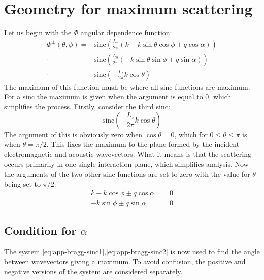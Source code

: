 \documentclass[11pt,twoside]{eitExjobb}
\begin{document}
	\section{Geometry for maximum scattering \label{sec:app-derivations-bragg}}
	Let us begin with the $\Phi$ angular dependence function:
	\begin{equation*}
	\begin{split}
		\Phi^\pm(\theta,\phi) =& \text{sinc} \left( \frac{L_{x}}{2\pi} \left( k - k\sin{\theta}\cos{\phi} \pm q\cos{\alpha} \right) \right) \\
		\cdot& \text{sinc} \left( \frac{L_{y}}{2\pi} \left( -k\sin{\theta}\sin{\phi} \pm q\sin{\alpha} \right) \right) \\
		\cdot& \text{sinc} \left( -\frac{L_{z}}{2\pi} k\cos{\theta} \right)
	\end{split}
	\end{equation*}
	The maximum of this function mush be where all sinc-functions are maximum. For a sinc the maximum is given when the argument is equal to 0, which simplifies the process. Firstly, consider the third sinc:
	\begin{equation*}
		\text{sinc} \left( -\frac{L_{z}}{2\pi} k\cos{\theta} \right)
	\end{equation*}
	The argument of this is obviously zero when $\cos{\theta} = 0$, which for $0 \leq \theta \leq \pi$ is when $\theta = \pi/2$. This fixes the maximum to the plane formed by the incident electromagnetic and acoustic wavevectors. What it means is that the scattering occurs primarily in one single interaction plane, which simplifies analysis. Now the arguments of the two other sinc functions are set to zero with the value for $\theta$ being set to $\pi/2$:
	\begin{align}
		k - k\cos{\phi} \pm q\cos{\alpha} &= 0 \label{eq:app-bragg-sinc1} \\
		-k\sin{\phi} \pm q\sin{\alpha} &= 0 \label{eq:app-bragg-sinc2}
	\end{align}
	
	\subsection{Condition for $\alpha$}
	The system \eqref{eq:app-bragg-sinc1},\eqref{eq:app-bragg-sinc2} is now used to find the angle between wavevectors giving a maximum. To avoid confusion, the positive and negative versions of the system are considered separately.
	
\end{document}
